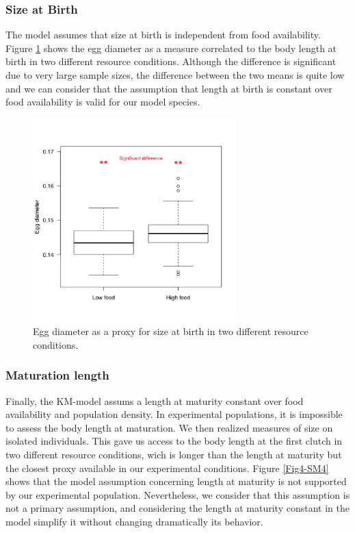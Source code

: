 \subsubsection{Size at Birth}

The model assumes that size at birth is independent from food availability.
Figure \ref{Fig4-SM3} shows the egg diameter as a measure correlated to the body
length at birth in two different resource conditions. Although the difference is
significant due to very large sample sizes, the difference between the two means
is quite low and we can consider that the assumption that length at birth is
constant over food availability is valid for our model species.

\begin{figure}[!ht] %
\centering
\includegraphics[width=0.7\textwidth]{4_ChapThe1/Fig/FigSM3.pdf}
\caption[Experimental measure of size
at birth]{Egg diameter as a proxy for size at birth in two different resource
conditions.}
\label{Fig4-SM3}
\end{figure}

\subsubsection{Maturation length}

Finally, the KM-model assums a length at maturity constant over food
availability and population density. In experimental populations, it is
impossible to assess the body length at maturation. We then realized measures of
size on isolated individuals. This gave us access to the body length at the
first clutch in two different resource conditions, wich is longer than the
length at maturity but the closest proxy available in our experimental
conditions. Figure \ref{Fig4-SM4} shows that the model assumption concerning
length at maturity is not supported by our experimental population. Nevertheless, we
consider that this assumption is not a primary assumption, and considering the
length at maturity constant in the model simplify it without changing
dramatically its behavior.

